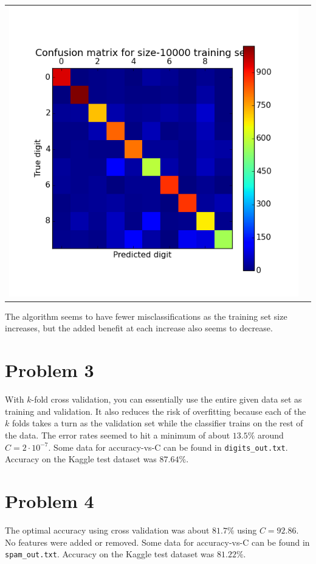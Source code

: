 \documentclass[11pt]{article}
\newcommand{\asdf}{\newline\newline}
\begin{document}
\begin{tabular}{cc}
\includegraphics[scale=0.5]{images/confusion_matrix_10000} &
\end{tabular}
The algorithm seems to have fewer misclassifications as the training set size increases, but the added benefit at each increase also seems to decrease.


\newpage
\section*{Problem 3}
With $k$-fold cross validation, you can essentially use the entire given data set as training and validation. It also reduces the risk of overfitting because each of the $k$ folds takes a turn as the validation set while the classifier trains on the rest of the data. \asdf
The error rates seemed to hit a minimum of about $13.5\%$ around $C=2\cdot 10^{-7}$. Some data for accuracy-vs-C can be found in \texttt{digits\_out.txt}. Accuracy on the Kaggle test dataset was $87.64\%$.


\section*{Problem 4}
The optimal accuracy using cross validation was about $81.7\%$ using $C=92.86$. No features were added or removed. Some data for accuracy-vs-C can be found in \texttt{spam\_out.txt}. Accuracy on the Kaggle test dataset was $81.22\%$.
\end{document}
